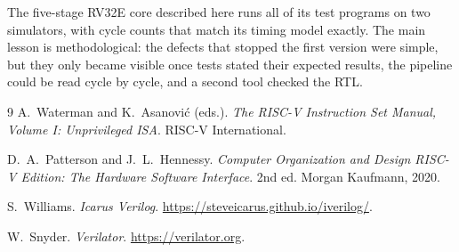 \documentclass[12pt]{article}
\begin{document}
The five-stage RV32E core described here runs all of its test programs on two
simulators, with cycle counts that match its timing model exactly. The main
lesson is methodological: the defects that stopped the first version were
simple, but they only became visible once tests stated their expected results,
the pipeline could be read cycle by cycle, and a second tool checked the RTL.

\begin{thebibliography}{9}
A.~Waterman and K.~Asanović (eds.).
\textit{The RISC-V Instruction Set Manual, Volume I: Unprivileged ISA}.
RISC-V International.

D.~A.~Patterson and J.~L.~Hennessy.
\textit{Computer Organization and Design RISC-V Edition: The Hardware Software
Interface}. 2nd ed. Morgan Kaufmann, 2020.

S.~Williams. \textit{Icarus Verilog}. \url{https://steveicarus.github.io/iverilog/}.

W.~Snyder. \textit{Verilator}. \url{https://verilator.org}.
\end{thebibliography}
\end{document}
